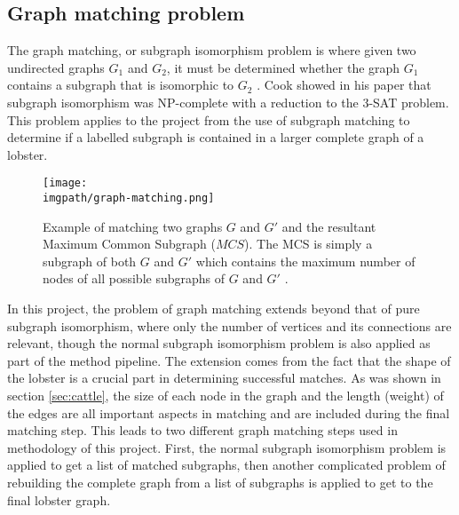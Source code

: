\subsection{Graph matching problem}
The graph matching, or subgraph isomorphism problem is where given two undirected graphs $G_1$ and $G_2$, it must be determined whether the graph $G_1$ contains a subgraph that is isomorphic to $G_2$ \cite{subgraph}. Cook showed in his paper that subgraph isomorphism was NP-complete with a reduction to the 3-SAT problem. This problem applies to the project from the use of subgraph matching to determine if a labelled subgraph is contained in a larger complete graph of a lobster. 
\begin{figure}[H]
\centering
\texttt{[image: \\imgpath/graph-matching.png]}
\caption{Example of matching two graphs $G$ and $G'$ and the resultant Maximum Common Subgraph ($MCS$). The MCS is simply a subgraph of both $G$ and $G'$ which contains the maximum number of nodes of all possible subgraphs of $G$ and $G'$ \cite{graph-matching}.}
\end{figure}
\noindent
In this project, the problem of graph matching extends beyond that of pure subgraph isomorphism, where only the number of vertices and its connections are relevant, though the normal subgraph isomorphism problem is also applied as part of the method pipeline. The extension comes from the fact that the shape of the lobster is a crucial part in determining successful matches. As was shown in section \ref{sec:cattle}, the size of each node in the graph and the length (weight) of the edges are all important aspects in matching and are included during the final matching step. This leads to two different graph matching steps used in methodology of this project. First, the normal subgraph isomorphism problem is applied to get a list of matched subgraphs, then another complicated problem of rebuilding the complete graph from a list of subgraphs is applied to get to the final lobster graph.